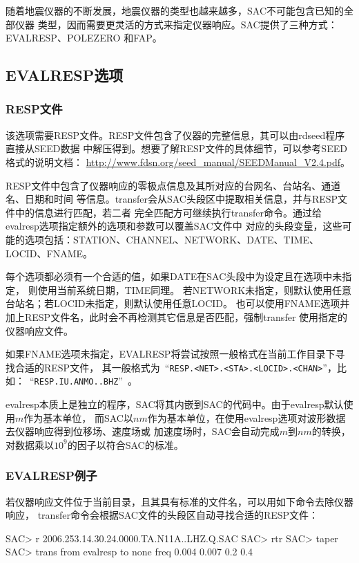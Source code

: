 随着地震仪器的不断发展，地震仪器的类型也越来越多，SAC不可能包含已知的全部仪器
类型，因而需要更灵活的方式来指定仪器响应。SAC提供了三种方式：EVALRESP、POLEZERO
和FAP。

\subsection{EVALRESP选项}
\subsubsection{RESP文件}
该选项需要RESP文件。RESP文件包含了仪器的完整信息，其可以由rdseed程序直接从SEED数据
中解压得到。想要了解RESP文件的具体细节，可以参考SEED格式的说明文档：
\url{http://www.fdsn.org/seed_manual/SEEDManual_V2.4.pdf}。

RESP文件中包含了仪器响应的零极点信息及其所对应的台网名、台站名、通道名、日期和时间
等信息。transfer会从SAC头段区中提取相关信息，并与RESP文件中的信息进行匹配，若二者
完全匹配方可继续执行transfer命令。通过给evalresp选项指定额外的选项和参数可以覆盖SAC文件中
对应的头段变量，这些可能的选项包括：STATION、CHANNEL、NETWORK、DATE、TIME、LOCID、FNAME。

每个选项都必须有一个合适的值，如果DATE在SAC头段中为设定且在选项中未指定，
则使用当前系统日期，TIME同理。
若NETWORK未指定，则默认使用任意台站名；若LOCID未指定，则默认使用任意LOCID。
也可以使用FNAME选项并加上RESP文件名，此时会不再检测其它信息是否匹配，强制transfer
使用指定的仪器响应文件。

如果FNAME选项未指定，EVALRESP将尝试按照一般格式在当前工作目录下寻找合适的RESP文件，
其一般格式为~``\lstinline{RESP.<NET>.<STA>.<LOCID>.<CHAN>}''，比如：~``\lstinline{RESP.IU.ANMO..BHZ}''~。

evalresp本质上是独立的程序，SAC将其内嵌到SAC的代码中。由于evalresp默认使用$m$作为基本单位，
而SAC以$nm$作为基本单位，在使用evalresp选项对波形数据去仪器响应得到位移场、速度场或
加速度场时，SAC会自动完成$m$到$nm$的转换，对数据乘以$10^9$的因子以符合SAC的标准。

\subsubsection{EVALRESP例子}
若仪器响应文件位于当前目录，且其具有标准的文件名，可以用如下命令去除仪器响应，
transfer命令会根据SAC文件的头段区自动寻找合适的RESP文件：
\begin{SACCode}
SAC> r 2006.253.14.30.24.0000.TA.N11A..LHZ.Q.SAC
SAC> rtr
SAC> taper
SAC> trans from evalresp to none freq 0.004 0.007 0.2 0.4
\end{SACCode}

